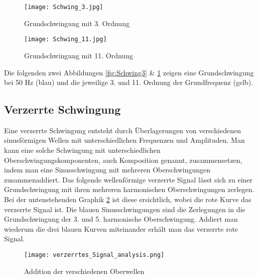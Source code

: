 \begin{figure}[ht!]
	\begin{minipage}[t]{0.49\textwidth}
		\centering
		\texttt{[image: Schwing\_3.jpg]}	
		\caption{Grundschwingung mit 3. Ordnung \cite{Oberwellen}}\label{fig:Schwing3}
	\end{minipage}	
	\begin{minipage}[t]{0.49\textwidth}	
		\centering	
		\texttt{[image: Schwing\_11.jpg]}	
		\caption{Grundschwingung mit 11. Ordnung \cite{Oberwellen}}\label{fig:Schwing11}
	\end{minipage}
\end{figure}
	
Die folgenden zwei Abbildungen \ref{fig:Schwing3} \& \ref{fig:Schwing11} zeigen eine Grundschwingung bei 50 Hz (blau) und die jeweilige 3. und 11. Ordnung der Grundfrequenz (gelb).

\subsection{Verzerrte Schwingung}
Eine verzerrte Schwingung entsteht durch Überlagerungen von verschiedenen sinusförmigen Wellen mit unterschiedlichen Frequenzen und Amplituden. Man kann eine solche Schwingung mit unterschiedlichen Oberschwingungskomponenten, auch Komposition genannt, zusammensetzen, indem man eine Sinusschwingung mit mehreren Oberschwingungen zusammenaddiert. Das folgende wellenförmige verzerrte Signal lässt sich zu einer Grundschwingung mit ihren mehreren harmonischen Oberschwingungen zerlegen. Bei der untenstehenden Graphik \ref{fig:Addition Oberwellen} ist diese ersichtlich, wobei die rote Kurve das verzerrte Signal ist. Die blauen Sinusschwingungen sind die Zerlegungen in die Grundschwingung der 3. und 5. harmonische Oberschwingung. Addiert man wiederum die drei blauen Kurven miteinander erhält man das verzerrte rote Signal.   

\begin{figure}[ht!]
	\centering
	\texttt{[image: verzerrtes\_Signal\_analysis.png]}	
	\caption{Addition der verschiedenen Oberwellen \cite{analysi3}}\label{fig:Addition Oberwellen}
\end{figure}


